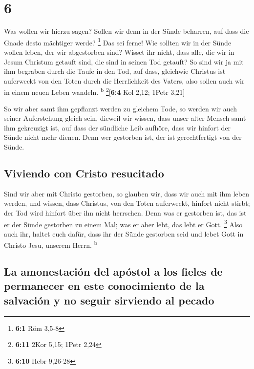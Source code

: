 \hypertarget{section-5}{%
\section{6}\label{section-5}}

 Was wollen wir hierzu sagen? Sollen wir denn in der Sünde
beharren, auf dass die Gnade desto mächtiger werde? \footnote{\textbf{6:1}
  Röm 3,5-8}  Das sei ferne! Wie sollten wir in der Sünde
wollen leben, der wir abgestorben sind?  Wisset ihr nicht,
dass alle, die wir in Jesum Christum getauft sind, die sind in seinen
Tod getauft?  So sind wir ja mit ihm begraben durch die
Taufe in den Tod, auf dass, gleichwie Christus ist auferweckt von den
Toten durch die Herrlichkeit des Vaters, also sollen auch wir in einem
neuen Leben wandeln. \textsuperscript{b} \footnote{\textbf{6:11} 2Kor
  5,15; 1Petr 2,24}{[}\textbf{6:4} Kol 2,12; 1Petr 3,21{]}

 So wir aber samt ihm gepflanzt werden zu gleichem Tode,
so werden wir auch seiner Auferstehung gleich sein, 
dieweil wir wissen, dass unser alter Mensch samt ihm gekreuzigt ist, auf
dass der sündliche Leib aufhöre, dass wir hinfort der Sünde nicht mehr
dienen.  Denn wer gestorben ist, der ist gerechtfertigt
von der Sünde.

\hypertarget{viviendo-con-cristo-resucitado}{%
\subsection{Viviendo con Cristo
resucitado}\label{viviendo-con-cristo-resucitado}}

 Sind wir aber mit Christo gestorben, so glauben wir, dass
wir auch mit ihm leben werden,  und wissen, dass Christus,
von den Toten auferweckt, hinfort nicht stirbt; der Tod wird hinfort
über ihn nicht herrschen.  Denn was er gestorben ist, das
ist er der Sünde gestorben zu einem Mal; was er aber lebt, das lebt er
Gott. \footnote{\textbf{6:10} Hebr 9,26-28}  Also auch
ihr, haltet euch dafür, dass ihr der Sünde gestorben seid und lebet Gott
in Christo Jesu, unserem Herrn. \textsuperscript{b}

\hypertarget{la-amonestaciuxf3n-del-apuxf3stol-a-los-fieles-de-permanecer-en-este-conocimiento-de-la-salvaciuxf3n-y-no-seguir-sirviendo-al-pecado}{%
\subsection{La amonestación del apóstol a los fieles de permanecer en
este conocimiento de la salvación y no seguir sirviendo al
pecado}\label{la-amonestaciuxf3n-del-apuxf3stol-a-los-fieles-de-permanecer-en-este-conocimiento-de-la-salvaciuxf3n-y-no-seguir-sirviendo-al-pecado}}

